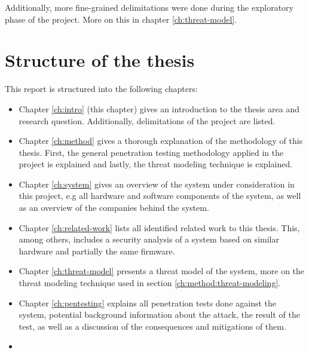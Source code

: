 \noindent Additionally, more fine-grained delimitations were done during the exploratory phase of the project. More on this in chapter \ref{ch:threat-model}.

\section{Structure of the thesis} \label{ch:intro:structure}
This report is structured into the following chapters:
\begin{itemize}
    \item Chapter \ref{ch:intro} (this chapter) gives an introduction to the thesis area and research question. Additionally, delimitations of the project are listed.
    \item Chapter \ref{ch:method} gives a thorough explanation of the methodology of this thesis. First, the general penetration testing methodology applied in the project is explained and lastly, the threat modeling technique is explained.
    \item Chapter \ref{ch:system} gives an overview of the system under consideration in this project, e.g all hardware and software components of the system, as well as an overview of the companies behind the system.
    \item Chapter \ref{ch:related-work} lists all identified related work to this thesis. This, among others, includes a security analysis of a system based on similar hardware and partially the same firmware.
    \item Chapter \ref{ch:threat-model} presents a threat model of the system, more on the threat modeling technique used in section \ref{ch:method:threat-modeling}.
    \item Chapter \ref{ch:pentesting} explains all penetration tests done against the system, potential background information about the attack, the result of the test, as well as a discussion of the consequences and mitigations of them.
    \item \todo
\end{itemize}
